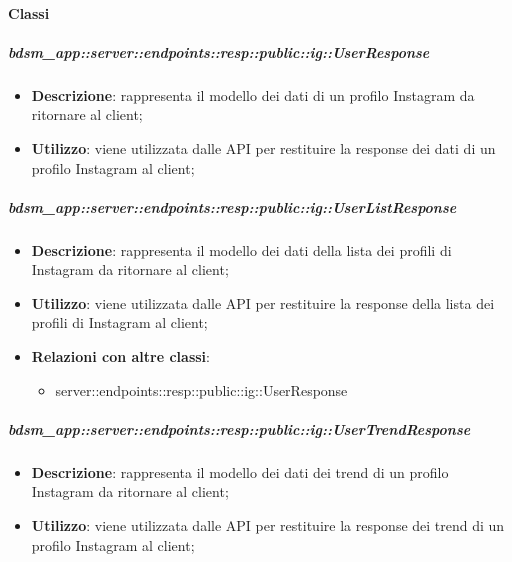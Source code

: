 	\paragraph{Classi} %

    \subparagraph{bdsm\_app::server::endpoints::resp::public::ig::UserResponse} %
    \label{subp:bdsm_app_server_endpoints_resp_public_ig_userresponse}
    \begin{itemize}
      \item \textbf{Descrizione}: rappresenta il modello dei dati di un profilo Instagram da ritornare al client;
      \item \textbf{Utilizzo}: viene utilizzata dalle API per restituire la response dei dati di un profilo Instagram al client;
      \end{itemize}

    \subparagraph{bdsm\_app::server::endpoints::resp::public::ig::UserListResponse} %
    \label{subp:bdsm_app_server_endpoints_resp_public_ig_userlistresponse}
    \begin{itemize}
      \item \textbf{Descrizione}: rappresenta il modello dei dati della lista dei profili di Instagram da ritornare al client;
      \item \textbf{Utilizzo}: viene utilizzata dalle API per restituire la response della lista dei profili di Instagram al client;
      \item \textbf{Relazioni con altre classi}:
        \begin{itemize}
          \item server::endpoints::resp::public::ig::UserResponse
        \end{itemize}
      \end{itemize}

    \subparagraph{bdsm\_app::server::endpoints::resp::public::ig::UserTrendResponse} %
    \label{subp:bdsm_app_server_endpoints_resp_public_ig_usertrendresponse}
    \begin{itemize}
      \item \textbf{Descrizione}: rappresenta il modello dei dati dei trend di un profilo Instagram da ritornare al client;
      \item \textbf{Utilizzo}: viene utilizzata dalle API per restituire la response dei trend di un profilo Instagram al client;
      \end{itemize}

